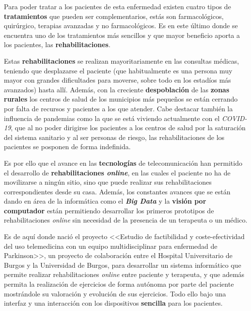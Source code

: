 Para poder tratar a los pacientes de esta enfermedad existen cuatro tipos de \textbf{tratamientos} que pueden ser complementarios, estás son farmacológicos, quirúrgico, terapias avanzadas y no farmacológicos. Es en este último donde se encuentra uno de los tratamientos más sencillos y que mayor beneficio aporta a los pacientes, las \textbf{rehabilitaciones}.

Estas \textbf{rehabilitaciones} se realizan mayoritariamente en las consultas médicas, teniendo que desplazarse el paciente (que habitualmente es una persona muy mayor con grandes dificultades para moverse, sobre todo en los estadíos más avanzados) hasta allí. Además, con la creciente \textbf{despoblación} de las \textbf{zonas rurales} los centros de salud de los municipios más pequeños se están cerrando por falta de recursos y pacientes a los que atender. Cabe destacar también la influencia de pandemias como la que se está viviendo actualmente con el \textit{COVID-19}, que al no poder dirigirse los pacientes a los centros de salud por la saturación del sistema sanitario y al ser personas de riesgo, las rehabilitaciones de los pacientes se posponen de forma indefinida.

Es por ello que el avance en las \textbf{tecnologías} de telecomunicación han permitido el desarrollo de \textbf{rehabilitaciones \textit{online}}, en las cuales el paciente no ha de movilizarse a ningún sitio, sino que puede realizar sus rehabilitaciones correspondientes desde su casa. Además, los constantes avances que se están dando en área de la informática como el \textbf{\textit{Big Data}} y la \textbf{visión por computador} están permitiendo desarrollar los primeros prototipos de rehabilitaciones \textit{online} sin necesidad de la presencia de un terapeuta o un médico.

Es de aquí donde nació el proyecto <<Estudio de factibilidad y coste-efectividad del uso telemedicina con un equipo multidisciplinar para enfermedad de Parkinson>>, un proyecto de colaboración entre el Hospital Universitario de Burgos y la Universidad de Burgos, para desarrollar un sistema informático que permite realizar rehabilitaciones \textit{online} entre paciente y terapeuta, y que además permita la realización de ejercicios de forma autónoma por parte del paciente mostrándole su valoración y evolución de sus ejercicios. Todo ello bajo una interfaz y una interacción con los dispositivos \textbf{sencilla} para los pacientes.

